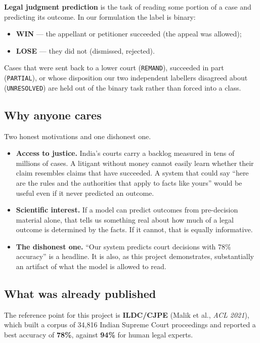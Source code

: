 \documentclass[12pt,a4paper]{article}
\newcommand{\code}[1]{\texttt{\small #1}}
\begin{document}
\textbf{Legal judgment prediction} is the task of reading some portion of a case and predicting its
outcome. In our formulation the label is binary:

\begin{itemize}
\item \textbf{WIN} --- the appellant or petitioner succeeded (the appeal was allowed);
\item \textbf{LOSE} --- they did not (dismissed, rejected).
\end{itemize}

Cases that were sent back to a lower court (\code{REMAND}), succeeded in part (\code{PARTIAL}), or
whose disposition our two independent labellers disagreed about (\code{UNRESOLVED}) are held out of
the binary task rather than forced into a class.

\subsection{Why anyone cares}

Two honest motivations and one dishonest one.

\begin{itemize}
\item \textbf{Access to justice.} India's courts carry a backlog measured in tens of millions of
cases. A litigant without money cannot easily learn whether their claim resembles claims that have
succeeded. A system that could say ``here are the rules and the authorities that apply to facts
like yours'' would be useful even if it never predicted an outcome.
\item \textbf{Scientific interest.} If a model can predict outcomes from pre-decision material
alone, that tells us something real about how much of a legal outcome is determined by the facts.
If it cannot, that is equally informative.
\item \textbf{The dishonest one.} ``Our system predicts court decisions with 78\% accuracy'' is a
headline. It is also, as this project demonstrates, substantially an artifact of what the model is
allowed to read.
\end{itemize}

\subsection{What was already published}

The reference point for this project is \textbf{ILDC/CJPE} (Malik et al., \emph{ACL 2021}), which
built a corpus of 34,816 Indian Supreme Court proceedings and reported a best accuracy of
\textbf{78\%}, against \textbf{94\%} for human legal experts.
\end{document}
